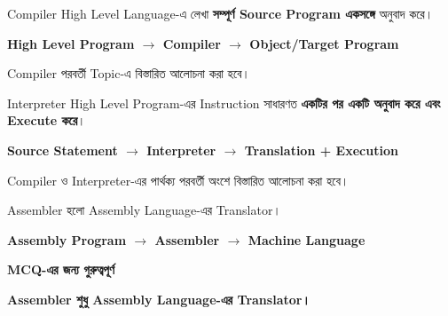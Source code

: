 
Compiler High Level Language-এ লেখা
\textbf{সম্পূর্ণ Source Program একসঙ্গে} অনুবাদ করে।

\begin{center}

\textbf{
High Level Program
\(\longrightarrow\)
Compiler
\(\longrightarrow\)
Object/Target Program
}

\end{center}

Compiler পরবর্তী Topic-এ বিস্তারিত আলোচনা করা হবে।


Interpreter High Level Program-এর Instruction সাধারণত
\textbf{একটির পর একটি অনুবাদ করে এবং Execute করে}।

\begin{center}

\textbf{
Source Statement
\(\longrightarrow\)
Interpreter
\(\longrightarrow\)
Translation + Execution
}

\end{center}

Compiler ও Interpreter-এর পার্থক্য পরবর্তী অংশে বিস্তারিত
আলোচনা করা হবে।


Assembler হলো Assembly Language-এর Translator।

\begin{center}

\textbf{
Assembly Program
\(\longrightarrow\)
Assembler
\(\longrightarrow\)
Machine Language
}

\end{center}

\begin{rememberbox}

\textbf{\color{deepOrange}MCQ-এর জন্য গুরুত্বপূর্ণ}

\textbf{Assembler শুধু Assembly Language-এর Translator।}

\end{rememberbox}


